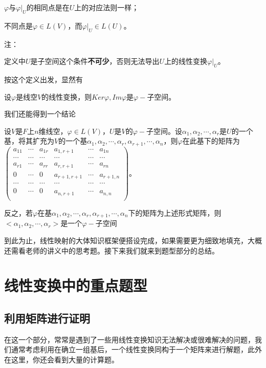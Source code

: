 \documentclass[lang=cn,10pt]{elegantbook}
\begin{document}
	$\varphi$与$\varphi|_U$的相同点是在$U$上的对应法则一样；
	
	不同点是$\varphi\in L(V)$，而$\varphi|_U\in L(U)$。
	
	注：
	
	定义中$U$是子空间这个条件\textbf{不可少}，否则无法导出$U$上的线性变换$\varphi|_U$。
	
	按这个定义出发，显然有
	
	设$\varphi$是线空$V$的线性变换，则$Ker\varphi,Im{\varphi}$是$\varphi-$子空间。
	
	我们还能得到一个结论
	\begin{conclusion}
		设$V$是$F$上$n$维线空$，\varphi\in L(V)$，$U$是$V$的$\varphi-$子空间。设$\alpha_1,\alpha_2,\cdots,\alpha_r$是$U$的一个基，将其扩充为$V$的一个基$\alpha_1,\alpha_2,\cdots,\alpha_r,\alpha_{r+1},\cdots,\alpha_n$，则$\varphi$在此基下的矩阵为$\left(\begin{matrix}a_{11}&\cdots&a_{1r}&a_{1,r+1}&\cdots&a_{1n}\\\cdots&\cdots&\cdots&\cdots&\cdots&\cdots\\a_{r1}&\cdots&a_{rr}&a_{r,r+1}&\cdots&a_{rn}\\0&\cdots&0&a_{r+1,r+1}&\cdots&a_{r+1,n}\\\cdots&\cdots&\cdots&\cdots&\cdots&\cdots\\0&\cdots&0&a_{n,r+1}&\cdots&a_{n,n}\\\end{matrix}\right)$。
		
		反之，若$\varphi$在基$\alpha_1,\alpha_2,\cdots,\alpha_r,\alpha_{r+1},\cdots,\alpha_n$下的矩阵为上述形式矩阵，则$<\alpha_1,\alpha_2,\cdots,\alpha_r>$是一个$\varphi-$子空间
	\end{conclusion}
	
	到此为止，线性映射的大体知识框架便搭设完成，如果需要更为细致地填充，大概还需看老师的讲义中的思考题。接下来我们就来到题型部分的总结。
	
\section{线性变换中的重点题型}
\subsection{利用矩阵进行证明}
在这一个部分，常常是遇到了一些用线性变换知识无法解决或很难解决的问题，我们通常考虑利用在确立一组基后，一个线性变换同构于一个矩阵来进行解题，此外在这里，你还会看到大量的计算题。
\end{document}
